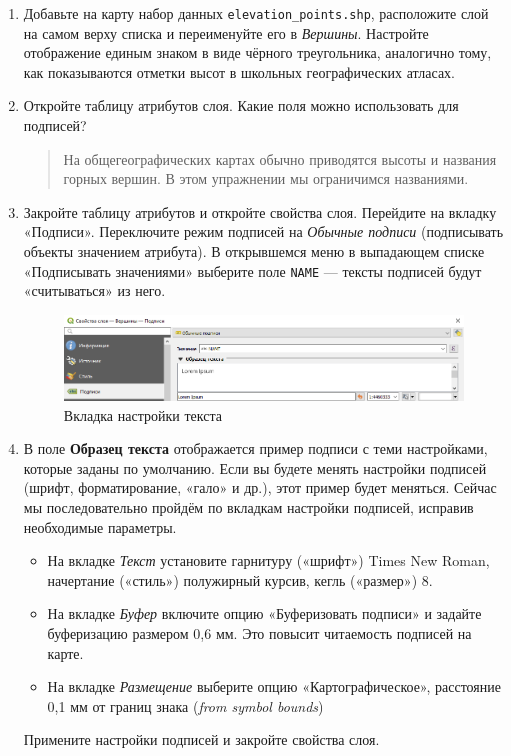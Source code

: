 \documentclass[
  12pt,
]{book}
\providecommand{\tightlist}{%
  \setlength{\itemsep}{0pt}\setlength{\parskip}{0pt}}
\begin{document}
\begin{enumerate}
\def\labelenumi{\arabic{enumi}.}
\item
  Добавьте на карту набор данных \texttt{elevation\_points.shp}, расположите слой на самом верху списка и переименуйте его в \emph{Вершины}. Настройте отображение единым знаком в виде чёрного треугольника, аналогично тому, как показываются отметки высот в школьных географических атласах.
\item
  Откройте таблицу атрибутов слоя. Какие поля можно использовать для подписей?

  \begin{quote}
  На общегеографических картах обычно приводятся высоты и названия горных вершин. В этом упражнении мы ограничимся названиями.
  \end{quote}
\item
  Закройте таблицу атрибутов и откройте свойства слоя. Перейдите на вкладку «Подписи». Переключите режим подписей на \emph{Обычные подписи} (подписывать объекты значением атрибута). В открывшемся меню в выпадающем списке «Подписывать значениями» выберите поле \texttt{NAME} --- тексты подписей будут «считываться» из него.

  \begin{figure}
  \centering
  \includegraphics{images/Ex01_MapGeneral/text1.png}
  \caption{Вкладка настройки текста}
  \end{figure}
\item
  В поле \textbf{Образец текста} отображается пример подписи с теми настройками, которые заданы по умолчанию. Если вы будете менять настройки подписей (шрифт, форматирование, «гало» и др.), этот пример будет меняться. Сейчас мы последовательно пройдём по вкладкам настройки подписей, исправив необходимые параметры.

  \begin{itemize}
  \tightlist
  \item
    На вкладке \emph{Текст} установите гарнитуру («шрифт») Times New Roman, начертание («стиль») полужирный курсив, кегль («размер») 8.
  \item
    На вкладке \emph{Буфер} включите опцию «Буферизовать подписи» и задайте буферизацию размером 0,6 мм. Это повысит читаемость подписей на карте.
  \item
    На вкладке \emph{Размещение} выберите опцию «Картографическое», расстояние 0,1 мм от границ знака (\emph{from symbol bounds})
  \end{itemize}

  Примените настройки подписей и закройте свойства слоя.
\end{enumerate}
\end{document}
